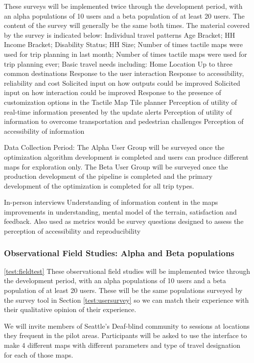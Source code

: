 These surveys will be implemented twice through the development period, with an alpha populations of 10 users and a beta population of at least 20 users.  
The content of the survey will generally be the same both times. The material covered by the survey is indicated below:
Individual travel patterns
 Age Bracket; HH Income Bracket; Disability Status; HH Size; Number of times tactile maps were used for trip planning in last month; Number of times tactile maps were used for trip planning ever; 
 Basic travel needs including:
Home Location
Up to three common destinations
Response to the user interaction
Response to accessibility, reliability and cost 
Solicited input on how outputs could be improved
Solicited input on how interaction could be improved
Response to the presence of customization options in the Tactile Map Tile planner
Perception of utility of real-time information presented by the update alerts
Perception of utility of information to overcome transportation and pedestrian challenges
Perception of accessibility of information 

Data Collection Period:
The Alpha User Group will be surveyed once the optimization algorithm development is completed and users can produce different maps for exploration only.
The Beta User Group will be surveyed once the production development of the pipeline is completed and the primary development of the optimization is completed for all trip types.

\ac{

In-person interviews
Understanding of information content in the maps
improvements in understanding, mental model of the terrain, satisfaction and feedback. Also used as metrics would be survey questions designed to assess the perception of accessibility and reproducibility
}

\subsubsection{Observational Field Studies: Alpha and Beta populations} 
\ref{test:fieldtest}
These observational field studies will be implemented twice through the development period, with an alpha populations of 10 users and a beta population of at least 20 users. These will be the same populations surveyed by the survey tool in Section \ref{test:usersurvey} so we can match their experience with their qualitative opinion of their experience.

We will invite members of Seattle’s Deaf-blind community to sessions at locations they frequent in the pilot areas. 
Participants will be asked to use the interface to make 4 different maps with different parameters and type of travel designation for each of those maps. 


